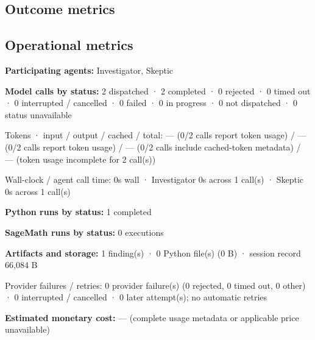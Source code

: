 \documentclass[11pt]{article}
\begin{document}
\subsection{Outcome metrics}
\subsection{Operational metrics}
\textbf{Participating agents:} Investigator, Skeptic\par
\textbf{Model calls by status:} 2 dispatched · 2 completed · 0 rejected · 0 timed out · 0 interrupted / cancelled · 0 failed · 0 in progress · 0 not dispatched · 0 status unavailable\par
Tokens · input / output / cached / total: — (0/2 calls report token usage) / — (0/2 calls report token usage) / — (0/2 calls include cached-token metadata) / — (token usage incomplete for 2 call(s))\par
Wall-clock / agent call time: 0s wall · Investigator 0s across 1 call(s) · Skeptic 0s across 1 call(s)\par
\textbf{Python runs by status:} 1 completed\par
\textbf{SageMath runs by status:} 0 executions\par
\textbf{Artifacts and storage:} 1 finding(s) · 0 Python file(s) (0 B) · session record 66,084 B\par
Provider failures / retries: 0 provider failure(s) (0 rejected, 0 timed out, 0 other) · 0 interrupted / cancelled · 0 later attempt(s); no automatic retries\par
\textbf{Estimated monetary cost:} — (complete usage metadata or applicable price unavailable)\par
\end{document}

